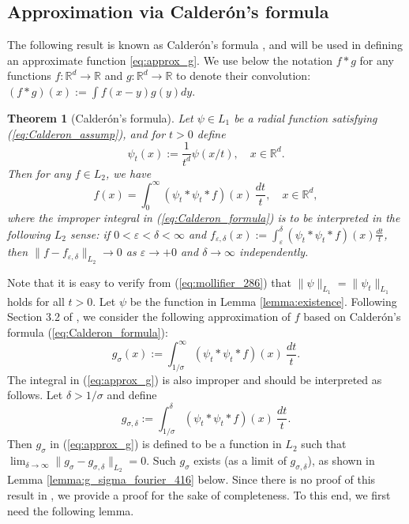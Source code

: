 \documentclass[11pt]{article}
\newtheorem{theorem}{Theorem}
\theoremstyle{remark}
\theoremstyle{example}
\theoremstyle{remark}
\newcommand{\R}{\mathbb{R}}
\newcommand{\citep}{\cite}
\begin{document}
\subsection{Approximation via Calder\'{o}n's  formula} \label{sec:sob_approx} 

The following result is known as Calder\'{o}n's  formula \citep[Theorem 1.2]{FraJawWei91}, and will be used in defining an approximate function \eqref{eq:approx_g}.
We use below the notation $f * g$ for any functions $f: \R^d \to \R$ and $g:  \R^d \to \R$ to denote their convolution: $(f * g) (x) := \int f(x-y)g(y) dy$.
%
\begin{theorem}[Calder\'{o}n's  formula]
Let $\psi \in L_1$ be a radial function satisfying (\ref{eq:Calderon_assump}), and for $t > 0$ define
\begin{equation} \label{eq:mollifier_286}
\psi_t(x) := \frac{1}{t^d}\psi(x/t), \quad x \in \R^d.
\end{equation}
Then for any $f \in L_2$, we have
\begin{equation} \label{eq:Calderon_formula}
f(x) = \int_0^\infty ({\psi_t} * \psi_t * f)(x)\ \frac{dt}{t}, \quad x \in \mathbb{R}^d,
\end{equation}
where the improper integral in (\ref{eq:Calderon_formula}) is to be interpreted in the following $L_2$ sense: if $0 < \varepsilon < \delta < \infty$ and $f_{\varepsilon, \delta}(x) := \int_{\varepsilon}^\delta ({\psi_t} * \psi_t * f)(x)\frac{dt}{t}$, then $\| f - f_{\varepsilon,\delta}\|_{L_2} \to 0$ as $\varepsilon \to +0$ and $\delta \to \infty$ independently.
\end{theorem}


Note that it is easy to verify from (\ref{eq:mollifier_286}) that
$\| \psi \|_{L_1} = \| \psi_t \|_{L_1}$ holds for all $t > 0$.
Let $\psi$ be the function in Lemma \ref{lemma:existence}. 
Following Section 3.2 of \cite{NarWar04}, we consider the following approximation of $f$ based on Calder\'{o}n's  formula (\ref{eq:Calderon_formula}):
\begin{equation} \label{eq:approx_g}
g_\sigma(x) := \int_{1/\sigma}^\infty ({\psi}_t * \psi_t * f)(x)\ \frac{dt}{t}.
\end{equation}
The integral in (\ref{eq:approx_g}) is also improper and should be interpreted as follows. 
Let $\delta > 1/\sigma$ and define 
\begin{equation} \label{eq:g_sigma_delta}
g_{\sigma, \delta} :=  \int_{1/\sigma}^\delta ({\psi}_t * \psi_t * f)(x)\ \frac{dt}{t}.
\end{equation}
Then $g_\sigma$ in (\ref{eq:approx_g}) is defined to be a function in $L_2$ such that $\lim_{\delta \to \infty} \| g_\sigma - g_{\sigma,\delta} \|_{L_2} = 0$.
Such $g_\sigma$ exists (as a limit of $g_{\sigma,\delta}$), as shown in Lemma \ref{lemma:g_sigma_fourier_416} below.
Since there is no proof of this result in \cite{NarWar04}, we provide a proof for the sake of completeness.
To this end, we first need the following lemma.
\end{document}
